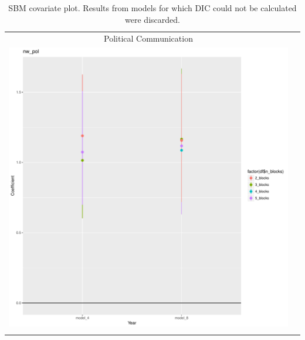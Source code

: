 \documentclass[fleqn,12pt]{wlscirep}
\begin{document}
\clearpage
\begin{longtable}[!h]{c@{\hskip 0cm}c}
Political Communication \\
\includegraphics[height=.75\textheight, clip=true, trim=.5cm .5cm 0cm .6cm]{figures/rl_plots2/nw_pol.pdf}   \\
\caption{\label{fig:SBM_plot_nwpol} SBM covariate plot. Results from models for which DIC could not be calculated were discarded.}
\end{longtable}
\end{document}
